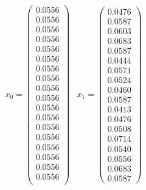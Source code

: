 	\begin{equation*}
	\begin{array}{cccc}
	x_{0} = 
	\left( \begin{array}{c}
	0.0556\\
	0.0556\\
	0.0556\\
	0.0556\\
	0.0556\\
	0.0556\\
	0.0556\\
	0.0556\\
	0.0556\\
	0.0556\\
	0.0556\\
	0.0556\\
	0.0556\\
	0.0556\\
	0.0556\\
	0.0556\\
	0.0556\\
	0.0556\\
	\end{array}\right) &
	
	x_{1} = 
	\left( \begin{array}{c}
    0.0476\\
    0.0587\\
    0.0603\\
    0.0683\\
    0.0587\\
    0.0444\\
    0.0571\\
    0.0524\\
    0.0460\\
    0.0587\\
    0.0413\\
    0.0476\\
    0.0508\\
    0.0714\\
    0.0540\\
    0.0556\\
    0.0683\\
    0.0587
	\end{array}\right)
	

\end{array}
\end{equation*}
